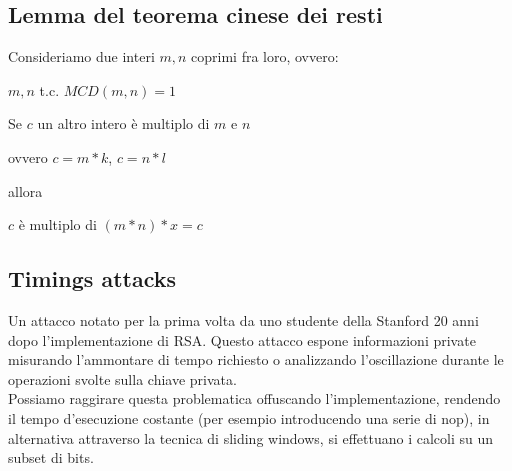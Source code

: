 \documentclass[11pt, oneside]{article}   	%
\begin{document}
\subsection*{Lemma del teorema cinese dei resti}
Consideriamo due interi $m, n$ coprimi fra loro, ovvero:
\begin{center}
$m,n$ t.c. $MCD(m,n) = 1$
\end{center}
Se $c$ un altro intero è multiplo di $m$ e $n$ \begin{center}
ovvero $c = m*k$, $c = n*l$\end{center}
 allora 
 \begin{center}
 $c$ è multiplo di $(m*n)*x = c$
 \end{center}
 
 
 \long{}

\subsection*{Timings attacks}
Un attacco notato per la prima volta da uno studente della Stanford 20 anni dopo l'implementazione di RSA. Questo attacco espone informazioni private misurando l'ammontare di tempo richiesto o analizzando l'oscillazione durante le operazioni svolte sulla chiave privata.\\
Possiamo raggirare questa problematica offuscando l'implementazione, rendendo il tempo d'esecuzione costante (per esempio introducendo una serie di nop), in alternativa attraverso la tecnica di sliding windows, si effettuano i calcoli su un subset di bits. 
\end{document}
